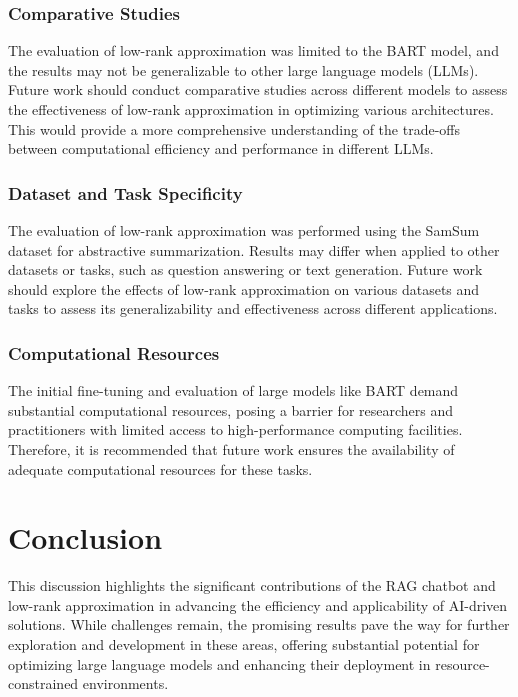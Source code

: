 \subsubsection{Comparative Studies}
The evaluation of low-rank approximation was limited to the BART model, and the results may not be generalizable to other large language models (LLMs). Future work should conduct comparative studies across different models to assess the effectiveness of low-rank approximation in optimizing various architectures. This would provide a more comprehensive understanding of the trade-offs between computational efficiency and performance in different LLMs.

\subsubsection{Dataset and Task Specificity}
The evaluation of low-rank approximation was performed using the SamSum dataset for abstractive summarization. Results may differ when applied to other datasets or tasks, such as question answering or text generation. Future work should explore the effects of low-rank approximation on various datasets and tasks to assess its generalizability and effectiveness across different applications.

\subsubsection{Computational Resources}
The initial fine-tuning and evaluation of large models like BART demand substantial computational resources, posing a barrier for researchers and practitioners with limited access to high-performance computing facilities. Therefore, it is recommended that future work ensures the availability of adequate computational resources for these tasks.

\section{Conclusion}

This discussion highlights the significant contributions of the RAG chatbot and low-rank approximation in advancing the efficiency and applicability of AI-driven solutions. While challenges remain, the promising results pave the way for further exploration and development in these areas, offering substantial potential for optimizing large language models and enhancing their deployment in resource-constrained environments.
